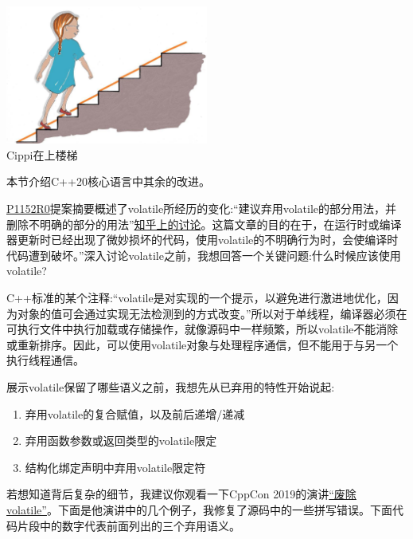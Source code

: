 \begin{center}
\includegraphics[width=0.5\textwidth]{content/3/chapter4/images/47.png}\\
Cippi在上楼梯
\end{center}

本节介绍C++20核心语言中其余的改进。


\href{http://www.open-std.org/jtc1/sc22/wg21/docs/papers/2018/p1152r0.html}{P1152R0}提案摘要概述了volatile所经历的变化:“建议弃用volatile的部分用法，并删除不明确的部分的用法”\href{https://www.zhihu.com/question/366070396}{知乎上的讨论}。这篇文章的目的在于，在运行时或编译器更新时已经出现了微妙损坏的代码，使用volatile的不明确行为时，会使编译时代码遭到破坏。”深入讨论volatile之前，我想回答一个关键问题:什么时候应该使用volatile?

C++标准的某个注释:“volatile是对实现的一个提示，以避免进行激进地优化，因为对象的值可会通过实现无法检测到的方式改变。”所以对于单线程，编译器必须在可执行文件中执行加载或存储操作，就像源码中一样频繁，所以volatile不能消除或重新排序。因此，可以使用volatile对象与处理程序通信，但不能用于与另一个执行线程通信。

展示volatile保留了哪些语义之前，我想先从已弃用的特性开始说起:

\begin{enumerate}
\item 
弃用volatile的复合赋值，以及前后递增/递减

\item 
弃用函数参数或返回类型的volatile限定

\item 
结构化绑定声明中弃用volatile限定符
\end{enumerate}

若想知道背后复杂的细节，我建议你观看一下CppCon 2019的演讲\href{https://www.youtube.com/watch?v=KJW_DLaVXIY}{“废除volatile”}。下面是他演讲中的几个例子，我修复了源码中的一些拼写错误。下面代码片段中的数字代表前面列出的三个弃用语义。

